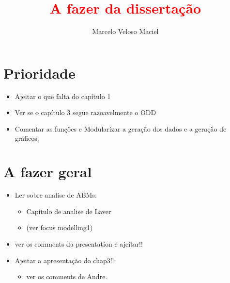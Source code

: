 \documentclass{article}
\title{\textcolor{red}{A fazer da dissertação}}
\author{Marcelo Veloso Maciel}
\date{}
\begin{document}
\pagecolor{base03}
\color{base1}

\maketitle


\section*{Prioridade}
\begin{itemize}
\item Ajeitar o que falta do capítulo 1
\item Ver se o capítulo 3 segue razoavelmente o ODD
\item Comentar as funções e Modularizar a geração dos dados e a geração de gráficos;
\end{itemize}

\section*{A fazer geral}
\begin{itemize}
\item Ler sobre analise de ABMs:
  \begin{itemize}
  \item Capítulo de analise de Laver
  \item (ver focus modelling1)
  \end{itemize}
  \item ver os comments da presentation e ajeitar!!
  \item Ajeitar a apresentação do chap3!!:
    \begin{itemize}
    \item ver os comments de Andre.
    \end{itemize}
\end{itemize}
\end{document}
